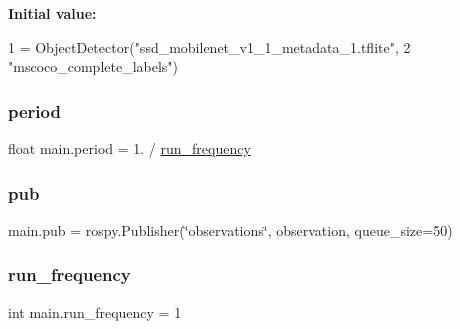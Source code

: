 {\bfseries Initial value\+:}
\begin{DoxyCode}
1 =  ObjectDetector(\textcolor{stringliteral}{"ssd\_mobilenet\_v1\_1\_metadata\_1.tflite"},
2                           \textcolor{stringliteral}{"mscoco\_complete\_labels"})
\end{DoxyCode}
\mbox{\label{namespacemain_a9ec7279618de6ff9195552f460584339}} 
\subsubsection{\texorpdfstring{period}{period}}
{\footnotesize\ttfamily float main.\+period = 1. / \hyperlink{namespacemain_a57172d55d7c1b86fc48bcbc6c3783efb}{run\+\_\+frequency}}

\mbox{\label{namespacemain_a23ee90a24cfdad17960b8fcc6a299545}} 
\subsubsection{\texorpdfstring{pub}{pub}}
{\footnotesize\ttfamily main.\+pub = rospy.\+Publisher(\char`\"{}observations\char`\"{}, observation, queue\+\_\+size=50)}

\mbox{\label{namespacemain_a57172d55d7c1b86fc48bcbc6c3783efb}} 
\subsubsection{\texorpdfstring{run\+\_\+frequency}{run\_frequency}}
{\footnotesize\ttfamily int main.\+run\+\_\+frequency = 1}

